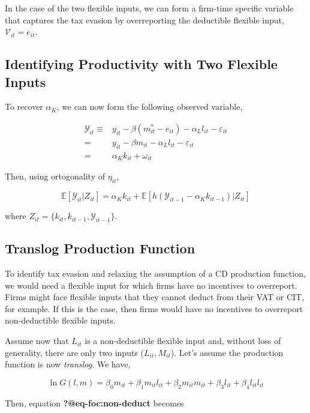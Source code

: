 \documentclass[
  12pt]{article}
\theoremstyle{definition}
\theoremstyle{remark}
\begin{document}
In the case of the two flexible inputs, we can form a firm-time specific
variable that captures the tax evasion by overreporting the deductible
flexible input, \(\mathcal{V}_{it}=e_{it}\).

\subsection{Identifying Productivity with Two Flexible
Inputs}\label{identifying-productivity-with-two-flexible-inputs}

To recover \(\alpha_K\), we can now form the following observed
variable,

\[
\begin{aligned}
    \mathcal{Y}_{it} \equiv& y_{it} - \beta (m^*_{it}-e_{it}) - \alpha_L l_{it} - \varepsilon_{it}\\
    =& y_{it} - \beta m_{it} - \alpha_L l_{it} - \varepsilon_{it}\\
    =& \alpha_K k_{it} + \omega_{it}
\end{aligned}
\]

Then, using ortogonality of \(\eta_{it}\),

\[
\mathbb{E}[\mathcal{Y}_{it}|Z_{it}]=\alpha_K k_{it} + \mathbb{E}[h(\mathcal{Y}_{it-1}-\alpha_K k_{it-1})|Z_{it}]
\]

where \(Z_{it}=\{k_{it},k_{it-1},\mathcal{Y}_{it-1}\}\).

\subsection{Translog Production
Function}\label{translog-production-function}

To identify tax evasion and relaxing the assumption of a CD production
function, we would need a flexible input for which firms have no
incentives to overreport. Firms might face flexible inputs that they
cannot deduct from their VAT or CIT, for example. If this is the case,
then firms would have no incentives to overreport non-deductible
flexible inputs.

Assume now that \(L_{it}\) is a non-deductible flexible input and,
without loss of generality, there are only two inputs
(\(L_{it}, M_{it}\)). Let's assume the production function is now
\emph{translog}. We have,

\[
 \ln G(l,m)=\beta_0m_{it}+\beta_1m_{it}l_{it}+\beta_2m_{it}m_{it}+\beta_3l_{it}+\beta_4l_{it}l_{it}
\]

Then, equation \textbf{?@eq-foc:non-deduct} becomes
\end{document}
